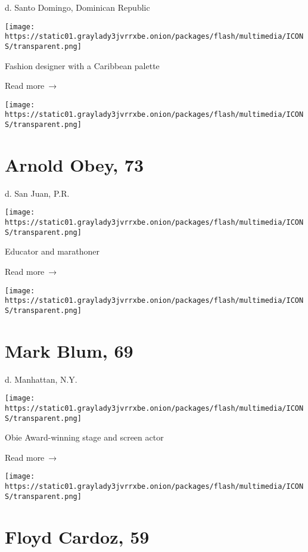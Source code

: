 d. Santo Domingo, Dominican Republic

\texttt{[image: https://static01.graylady3jvrrxbe.onion/packages/flash/multimedia/ICONS/transparent.png]}

Fashion designer with a Caribbean palette

 Read more~→

\href{https://www.nytimes3xbfgragh.onion/2020/03/27/obituaries/arnold-obey-dead-coronavirus.html}{}

\texttt{[image: https://static01.graylady3jvrrxbe.onion/packages/flash/multimedia/ICONS/transparent.png]}

\hypertarget{arnold-obey-73}{%
\section{Arnold Obey, 73}\label{arnold-obey-73}}

d. San Juan, P.R.

\texttt{[image: https://static01.graylady3jvrrxbe.onion/packages/flash/multimedia/ICONS/transparent.png]}

Educator and marathoner

 Read more~→

\href{https://www.nytimes3xbfgragh.onion/2020/03/27/theater/mark-blum-dead-coronavirus.html}{}

\texttt{[image: https://static01.graylady3jvrrxbe.onion/packages/flash/multimedia/ICONS/transparent.png]}

\hypertarget{mark-blum-69}{%
\section{Mark Blum, 69}\label{mark-blum-69}}

d. Manhattan, N.Y.

\texttt{[image: https://static01.graylady3jvrrxbe.onion/packages/flash/multimedia/ICONS/transparent.png]}

Obie Award-winning stage and screen actor

 Read more~→

\href{https://www.nytimes3xbfgragh.onion/2020/03/25/dining/floyd-cardoz-dead-coronavirus.html}{}

\texttt{[image: https://static01.graylady3jvrrxbe.onion/packages/flash/multimedia/ICONS/transparent.png]}

\hypertarget{floyd-cardoz-59}{%
\section{Floyd Cardoz, 59}\label{floyd-cardoz-59}}

